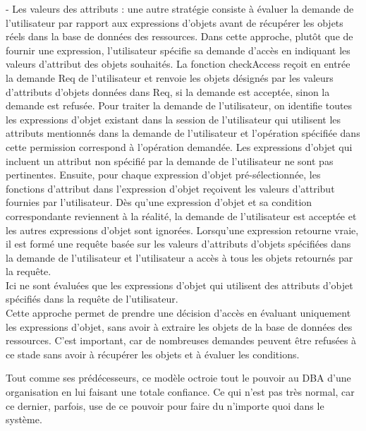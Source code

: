 {- Les valeurs des attributs : une autre stratégie consiste à évaluer la demande de l'utilisateur par rapport aux expressions d'objets avant de récupérer les objets réels dans la base de données des ressources. Dans cette approche, plutôt que de fournir une expression, l'utilisateur spécifie sa demande d'accès en indiquant les valeurs d'attribut des objets souhaités. La fonction checkAccess reçoit en entrée la demande Req de l'utilisateur et renvoie les objets désignés par les valeurs d'attributs d'objets données dans Req, si la demande est acceptée, sinon la demande est refusée. Pour traiter la demande de l'utilisateur, on identifie toutes les expressions d'objet existant dans la session de l'utilisateur qui utilisent les attributs mentionnés dans la demande de l'utilisateur et l'opération spécifiée dans cette permission correspond à l'opération demandée. Les expressions d'objet qui incluent un attribut non spécifié par la demande de l'utilisateur ne sont pas pertinentes. Ensuite, pour chaque expression d'objet pré-sélectionnée, les fonctions d'attribut dans l'expression d'objet reçoivent les valeurs d'attribut fournies par l'utilisateur. Dès qu'une expression d'objet et sa condition correspondante reviennent à la réalité, la demande de l'utilisateur est acceptée et les autres expressions d'objet sont ignorées. Lorsqu'une expression retourne vraie, il est formé une requête basée sur les valeurs d'attributs d'objets spécifiées dans la demande de l'utilisateur et l'utilisateur a accès à tous les objets retournés par la requête. \\
Ici ne sont évaluées que les expressions d'objet qui utilisent des attributs d'objet spécifiés dans la requête de l'utilisateur. \\
Cette approche permet de prendre une décision d'accès en évaluant uniquement les expressions d'objet, sans avoir à extraire les objets de la base de données des ressources. C'est important, car de nombreuses demandes peuvent être refusées à ce stade sans avoir à récupérer les objets et à évaluer les conditions. 
}

\label{sectionInconvéniantARBAC}

Tout comme ses prédécesseurs, ce modèle octroie tout le pouvoir au DBA d'une organisation en lui faisant une totale confiance. Ce qui n'est pas très normal, car ce dernier, parfois, use de ce pouvoir pour faire du n'importe quoi dans le système.

\label{sectionARBAC}
 
